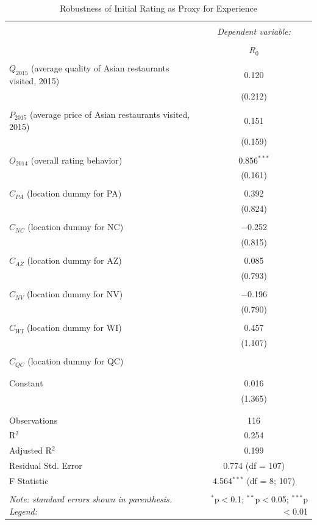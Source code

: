\documentclass[Journal,letterpaper, NoLineNumbers]{ascelike-new}
\begin{document}
\begin{table}[!htbp] \centering 
  \caption{Robustness of Initial Rating as Proxy for Experience} 
  \label{} 
\begin{tabular}{@{\extracolsep{5pt}}lc} 
\\[-1.8ex]\hline 
\hline \\[-1.8ex] 
 & \multicolumn{1}{c}{\textit{Dependent variable:}} \\ 
\cline{2-2} 
\\[-1.8ex] & $R_0$ \\ 
\hline \\[-1.8ex] 
 $Q_{2015}$ (average quality of Asian restaurants visited, 2015)& 0.120 \\ 
  & (0.212) \\ 
  & \\ 
 $P_{2015}$ (average price of Asian restaurants visited, 2015) & 0.151 \\ 
  & (0.159) \\ 
  & \\ 
 $O_{2014}$ (overall rating behavior) & 0.856$^{***}$ \\ 
  & (0.161) \\ 
  & \\ 
 $C_{PA}$ (location dummy for PA)& 0.392 \\ 
  & (0.824) \\ 
  & \\ 
 $C_{NC}$ (location dummy for NC)& $-$0.252 \\ 
  & (0.815) \\ 
  & \\ 
 $C_{AZ}$ (location dummy for AZ)& 0.085 \\ 
  & (0.793) \\ 
  & \\ 
 $C_{NV}$ (location dummy for NV)& $-$0.196 \\ 
  & (0.790) \\ 
  & \\ 
 $C_{WI}$ (location dummy for WI)& 0.457 \\ 
  & (1.107) \\ 
  & \\ 
 $C_{QC}$ (location dummy for QC)&  \\ 
  &  \\ 
  & \\ 
 Constant & 0.016 \\ 
  & (1.365) \\ 
  & \\ 
\hline \\[-1.8ex] 
Observations & 116 \\ 
R$^{2}$ & 0.254 \\ 
Adjusted R$^{2}$ & 0.199 \\ 
Residual Std. Error & 0.774 (df = 107) \\ 
F Statistic & 4.564$^{***}$ (df = 8; 107) \\ 
\hline 
\hline \\[-1.8ex] 
\textit{Note: standard errors shown in parenthesis. Legend: }  & \multicolumn{1}{r}{$^{*}$p$<$0.1; $^{**}$p$<$0.05; $^{***}$p$<$0.01} \\ 
\end{tabular} 
\end{table} 
\end{document}
